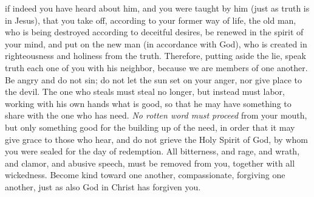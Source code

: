 \begin{biblechapter}
\verse if indeed you have heard about him, and you were taught by him (just as truth is in Jesus),
\verse that you take off, according to your former way of life, the old man, who is being destroyed according to deceitful desires,
\verse be renewed in the spirit of your mind,
\verse and put on the new man (in accordance with God), who is created in righteousness and holiness from the truth.
 Therefore, putting aside the lie, speak truth each one of you with his neighbor, because we are members of one another.
\verse Be angry and do not sin; do not let the sun set on your anger,
\verse nor give place to the devil.
\verse The one who steals must steal no longer, but instead must labor, working with his own hands what is good, so that he may have something to share with the one who has need.
\verse \textit{No rotten word must proceed} from your mouth, but only something good for the building up of the need, in order that it may give grace to those who hear,
\verse and do not grieve the Holy Spirit of God, by whom you were sealed for the day of redemption.
\verse All bitterness, and rage, and wrath, and clamor, and abusive speech, must be removed from you, together with all wickedness.
\verse Become kind toward one another, compassionate, forgiving one another, just as also God in Christ has forgiven you.
\end{biblechapter}

